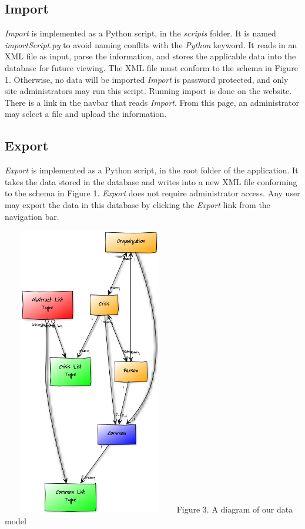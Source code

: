 \documentclass[12pt]{report}
\begin{document}
\subsection*{Import}
\emph{Import} is implemented as a Python script, in the \emph{scripts} folder.
It is named \emph{importScript.py} to avoid naming conflits with the \emph{Python} keyword.
It reads in an XML file as input, parse the information, and stores the applicable data into the database for future viewing.
The XML file must conform to the schema in Figure 1.
Otherwise, no data will be imported
\emph{Import} is password protected, and only site administrators may run this script.
Running import is done on the website.
There is a link in the navbar that reads \emph{Import}.
From this page, an administrator may select a file and upload the information.

\subsection*{Export}
\emph{Export} is implemented as a Python script, in the root folder of the application.
It takes the data stored in the database and writes into a new XML file conforming to the schema in Figure 1.
\emph{Export} does not require administrator access.
Any user may export the data in this database by clicking the \emph{Export} link from the navigation bar.

\hfill \newline \newline
\includegraphics*[width=3in,height=5in]{dataModelDiagram.png}
\newline
\footnotesize
Figure 3. A diagram of our data model %
\normalsize
\newpage
\end{document}
